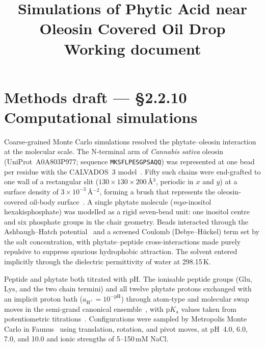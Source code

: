 \documentclass[11pt]{article}
\title{Simulations of Phytic Acid near Oleosin Covered Oil Drop\\
       \large Working document}
\author{}
\date{}
\begin{document}
\maketitle

\section{Methods draft --- \S2.2.10 Computational simulations}

Coarse-grained Monte Carlo simulations resolved the phytate--oleosin
interaction at the molecular scale.  The N-terminal arm of
\textit{Cannabis sativa} oleosin (UniProt~A0A803P977; sequence
\texttt{MKSFLPESGPSAQQ}) was represented at one bead per residue with the
CALVADOS~3 model~\cite{Tesei2021,Cao2024}.  Fifty such chains were end-grafted to
one wall of a rectangular slit ($130\times130\times200$\,\AA$^{3}$,
periodic in $x$ and $y$) at a surface density of
$3\times10^{-3}$\,\AA$^{-2}$, forming a brush that represents the
oleosin-covered oil-body surface~\cite{Tzen1992}.  A single phytate
molecule (\textit{myo}-inositol hexakisphosphate) was modelled as a rigid
seven-bead unit: one inositol centre and six phosphate groups in the chair
geometry.  Beads interacted through the Ashbaugh--Hatch
potential~\cite{Ashbaugh2008} and a screened Coulomb (Debye--H\"uckel) term
set by the salt concentration, with phytate--peptide cross-interactions
made purely repulsive to suppress spurious hydrophobic attraction.  The
solvent entered implicitly through the dielectric permittivity of water at
298.15\,K.

Peptide and phytate both titrated with pH.  The ionisable peptide groups
(Glu, Lys, and the two chain termini) and all twelve phytate protons
exchanged with an implicit proton bath ($a_{\mathrm{H}^+}=10^{-\mathrm{pH}}$)
through atom-type and molecular swap moves in the semi-grand canonical
ensemble~\cite{SmithTriska1994}, with p$K_\mathrm{a}$ values taken from
potentiometric titrations~\cite{Grimsley2009,DeStefano2003}.  Configurations
were sampled by Metropolis Monte Carlo in Faunus~\cite{Stenqvist2013} using
translation, rotation, and pivot moves, at pH~4.0, 6.0, 7.0, and 10.0 and
ionic strengths of 5--150\,mM NaCl.
\end{document}
